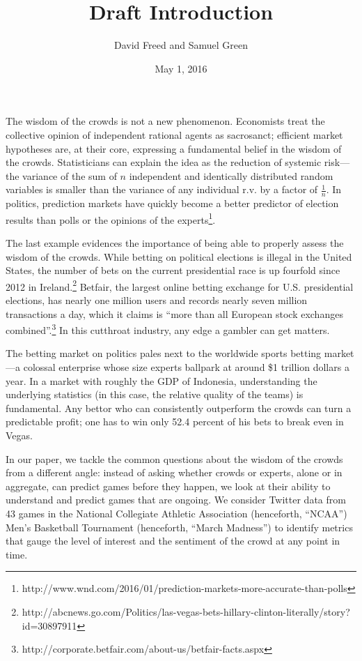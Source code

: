 \documentclass[12pt]{article}
\begin{document}
\setcounter{page}{1}
\begin{doublespacing}

\title{Draft Introduction}
\author{David Freed and Samuel Green}
\date{May 1, 2016}
\maketitle

The wisdom of the crowds is not a new phenomenon. Economists treat the collective opinion of independent rational agents as sacrosanct; efficient market hypotheses are, at their core, expressing a fundamental belief in the wisdom of the crowds. Statisticians can explain the idea as the reduction of systemic risk---the variance of the sum of $n$ independent and identically distributed random variables is smaller than the variance of any individual r.v. by a factor of $\frac{1}{n}$. In politics, prediction markets have quickly become a better predictor of election results than polls or the opinions of the experts\footnote{http://www.wnd.com/2016/01/prediction-markets-more-accurate-than-polls}.

The last example evidences the importance of being able to properly assess the wisdom of the crowds. While betting on political elections is illegal in the United States, the number of bets on the current presidential race is up fourfold since 2012 in Ireland.\footnote{http://abcnews.go.com/Politics/las-vegas-bets-hillary-clinton-literally/story?id=30897911} Betfair, the largest online betting exchange for U.S. presidential elections, has nearly one million users and records nearly seven million transactions a day, which it claims is ``more than all European stock exchanges combined''.\footnote{http://corporate.betfair.com/about-us/betfair-facts.aspx} In this cutthroat industry, any edge a gambler can get matters. 

The betting market on politics pales next to the worldwide sports betting market---a colossal enterprise whose size experts ballpark at around \$1 trillion dollars a year. In a market with roughly the GDP of Indonesia, understanding the underlying statistics (in this case, the relative quality of the teams) is fundamental. Any bettor who can consistently outperform the crowds can turn a predictable profit; one has to win only 52.4 percent of his bets to break even in Vegas. 

In our paper, we tackle the common questions about the wisdom of the crowds from a different angle: instead of asking whether crowds or experts, alone or in aggregate, can predict games before they happen, we look at their ability to understand and predict games that are ongoing. We consider Twitter data from 43 games in the National Collegiate Athletic Association (henceforth, ``NCAA'') Men's Basketball Tournament (henceforth, ``March Madness'') to identify metrics that gauge the level of interest and the sentiment of the crowd at any point in time. 


\end{doublespacing}
\end{document}
